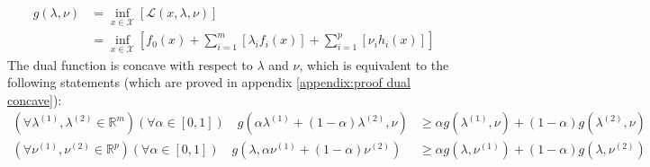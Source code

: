 \begin{align}
    g(\lambda, \nu) &= \underset{x\in\mathcal{X}}{\inf}\left[\mathcal{L}(x, \lambda, \nu)\right] \label{eq:dual function} \\
    &= \underset{x\in\mathcal{X}}{\inf}\left[f_0(x) + \sum_{i=1}^{m}[\lambda_i f_i(x)] + \sum_{i=1}^{p}[\nu_i h_i(x)]\right]
\end{align}
The dual function is concave with respect to $\lambda$ and $\nu$, which is equivalent to the following statements (which are proved in appendix \ref{appendix:proof dual concave}):
\begin{align}
    (\forall\lambda^{(1)},\lambda^{(2)}\in\mathbb{R}^m)(\forall\alpha\in[0, 1]) \quad g(\alpha\lambda^{(1)} + (1 - \alpha)\lambda^{(2)}, \nu) &\ge \alpha g(\lambda^{(1)}, \nu) + (1 - \alpha) g(\lambda^{(2)}, \nu) \label{eq:dual concave lambda} \\
    (\forall\nu^{(1)},\nu^{(2)}\in\mathbb{R}^p)(\forall\alpha\in[0, 1]) \quad g(\lambda, \alpha\nu^{(1)} + (1 - \alpha)\nu^{(2)}) &\ge \alpha g(\lambda, \nu^{(1)}) + (1 - \alpha) g(\lambda, \nu^{(2)})\label{eq:dual concave nu}
\end{align}

